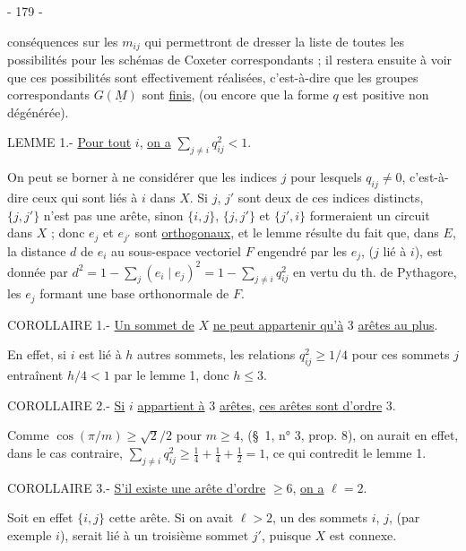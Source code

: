 \begin{center}- 179 -\end{center}

conséquences sur les $m_{ij}$ qui permettront de dresser la liste de toutes les possibilités pour les schémas de Coxeter correspondants ; il restera ensuite à voir que ces possibilités sont effectivement réalisées, c'est-à-dire que les groupes correspondants $G(\underline M)$ sont \uline{finis}, (ou encore que la forme $q$ est positive non dégénérée).

LEMME 1.- \uline{Pour tout} $i$, \uline{on a} $\displaystyle\sum_{j\ne i}q_{ij}^2<1$.

On peut se borner à ne considérer que les indices $j$ pour lesquels $q_{ij}\ne0$, c'est-à-dire ceux qui sont liés à $i$ dans $X$. Si $j$, $j'$ sont deux de ces indices distincts, $\{j,j'\}$ n'est pas une arête, sinon $\{i,j\}$, $\{j,j'\}$ et $\{j',i\}$ formeraient un circuit dans $X$ ; donc $e_j$ et $e_{j'}$ sont \uline{orthogonaux}, et le lemme résulte du fait que, dans $E$, la distance $d$ de $e_i$ au sous-espace vectoriel $F$ engendré par les $e_j$, ($j$ lié à $i$), est donnée par $\displaystyle d^2=1-\sum_j(e_i\mid e_j)^2=1-\sum_{j\ne i}q_{ij}^2$ en vertu du th. de Pythagore, les $e_j$ formant une base orthonormale de $F$.

COROLLAIRE 1.- \uline{Un sommet de} $X$ \uline{ne peut appartenir qu'à} 3 \uline{arêtes au plus}.

En effet, si $i$ est lié à $h$ autres sommets, les relations $q_{ij}^2\geq1/4$ pour ces sommets $j$ entraînent $h/4<1$ par le lemme 1, donc $h\leq3$.

COROLLAIRE 2.- \uline{Si} $i$ \uline{appartient à} 3 \uline{arêtes}, \uline{ces arêtes sont d'ordre} 3.

Comme $\cos(\pi/m)\geq\sqrt2/2$ pour $m\geq4$, (\S\ 1, n° 3, prop. 8), on aurait en effet, dans le cas contraire, $\displaystyle\sum_{j\ne i}q_{ij}^2\geq\frac14+\frac14+\frac12=1$, ce qui contredit le lemme 1.

COROLLAIRE 3.- \uline{S'il existe une arête d'ordre} $\geq6$, \uline{on a} $\ell=2$.

Soit en effet $\{i,j\}$ cette arête. Si on avait $\ell>2$, un des sommets $i$, $j$, (par exemple $i$), serait lié à un troisième sommet $j'$, puisque $X$ est connexe.
